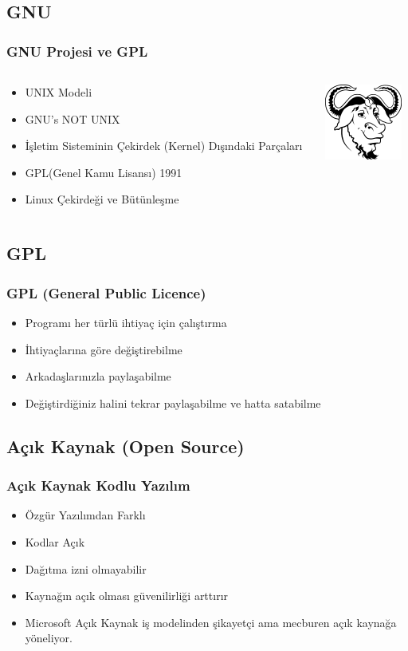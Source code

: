\documentclass{beamer}
\begin{document}
	\subsection{GNU}
		\begin{frame}
		 	\frametitle{GNU Projesi ve GPL}
			\begin{columns}
			\begin{column}[l]{5cm}
				\begin{itemize}[<+->]
					\item UNIX Modeli
					\item GNU's NOT UNIX
					\item İşletim Sisteminin Çekirdek (Kernel) Dışındaki Parçaları
					\item GPL(Genel Kamu Lisansı) 1991
					\item Linux Çekirdeği ve Bütünleşme
				\end{itemize}
			\end{column}
			\begin{column}[r]{5cm}		
				\includegraphics{gnukucuk.jpg}
			\end{column}
			\end{columns}


		\end{frame}
	\subsection{GPL}
		\begin{frame}
		 	\frametitle{GPL (General Public Licence)}
			\begin{itemize}
			 \item Programı her türlü ihtiyaç için çalıştırma
			 \item İhtiyaçlarına göre değiştirebilme
			 \item Arkadaşlarınızla paylaşabilme
			 \item Değiştirdiğiniz halini tekrar paylaşabilme ve hatta satabilme
			\end{itemize}

		\end{frame}


	\subsection{Açık Kaynak (Open Source)}
		\begin{frame}
		 	\frametitle{Açık Kaynak Kodlu Yazılım}
			\begin{itemize}
			 \item Özgür Yazılımdan Farklı
			 \item Kodlar Açık
			 \item Dağıtma izni olmayabilir
			 \item Kaynağın açık olması güvenilirliği arttırır
			 \item Microsoft Açık Kaynak iş modelinden şikayetçi ama mecburen açık kaynağa yöneliyor.
			\end{itemize}
		\end{frame}
\end{document}
